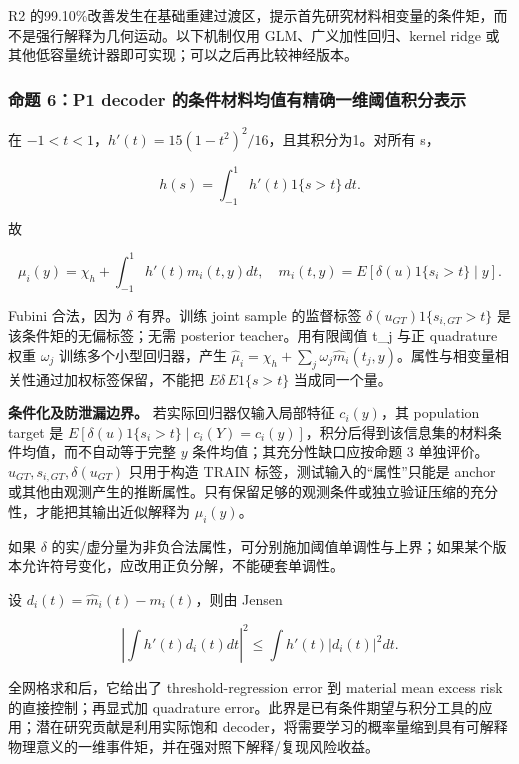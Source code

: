 \documentclass[
  11pt,
  a4paper,
]{article}
\begin{document}
R2
的99.10\%改善发生在基础重建过渡区，提示首先研究材料相变量的条件矩，而不是强行解释为几何运动。以下机制仅用
GLM、广义加性回归、kernel ridge
或其他低容量统计器即可实现；可以之后再比较神经版本。

\hypertarget{ux547dux9898-6p1-decoder-ux7684ux6761ux4ef6ux6750ux6599ux5747ux503cux6709ux7cbeux786eux4e00ux7ef4ux9608ux503cux79efux5206ux8868ux793a}{%
\subsubsection{命题 6：P1 decoder
的条件材料均值有精确一维阈值积分表示}\label{ux547dux9898-6p1-decoder-ux7684ux6761ux4ef6ux6750ux6599ux5747ux503cux6709ux7cbeux786eux4e00ux7ef4ux9608ux503cux79efux5206ux8868ux793a}}

在 \(-1<t<1\)，\(h'(t)=15(1-t^2)^2/16\)，且其积分为1。对所有 s，

\[
h(s)=\int_{-1}^{1}h'(t)1\{s>t\}\,dt.
\]

故

\[
\mu_i(y)=\chi_h+\int_{-1}^{1}h'(t)m_i(t,y)dt,
\quad m_i(t,y)=E[\delta(u)1\{s_i>t\}\mid y].
\]

Fubini 合法，因为 \(\delta\) 有界。训练 joint sample 的监督标签
\(\delta(u_{GT})1\{s_{i,GT}>t\}\) 是该条件矩的无偏标签；无需 posterior
teacher。用有限阈值 t\_\allowbreak{}j 与正 quadrature 权重 \(\omega_j\)
训练多个小型回归器，产生
\(\hat\mu_i=\chi_h+\sum_j\omega_j\hat m_i(t_j,y)\)。属性与相变量相关性通过加权标签保留，不能把
\(E\delta\,E1\{s>t\}\) 当成同一个量。

\textbf{条件化及防泄漏边界。} 若实际回归器仅输入局部特征 \(c_i(y)\)，其
population target 是
\(E[\delta(u)1\{s_i>t\}\mid c_i(Y)=c_i(y)]\)，积分后得到该信息集的材料条件均值，而不自动等于完整
\(y\) 条件均值；其充分性缺口应按命题 3
单独评价。\(u_{GT},s_{i,GT},\delta(u_{GT})\) 只用于构造 TRAIN
标签，测试输入的``属性''只能是 anchor
或其他由观测产生的推断属性。只有保留足够的观测条件或独立验证压缩的充分性，才能把其输出近似解释为
\(\mu_i(y)\)。

如果 \(\delta\)
的实/虚分量为非负合法属性，可分别施加阈值单调性与上界；如果某个版本允许符号变化，应改用正负分解，不能硬套单调性。

设 \(d_i(t)=\hat m_i(t)-m_i(t)\)，则由 Jensen

\[
\left|\int h'(t)d_i(t)dt\right|^2\le\int h'(t)|d_i(t)|^2dt.
\]

全网格求和后，它给出了 threshold-regression error 到 material mean
excess risk 的直接控制；再显式加 quadrature
error。此界是已有条件期望与积分工具的应用；潜在研究贡献是利用实际饱和
decoder，将需要学习的概率量缩到具有可解释物理意义的一维事件矩，并在强对照下解释/复现风险收益。
\end{document}
